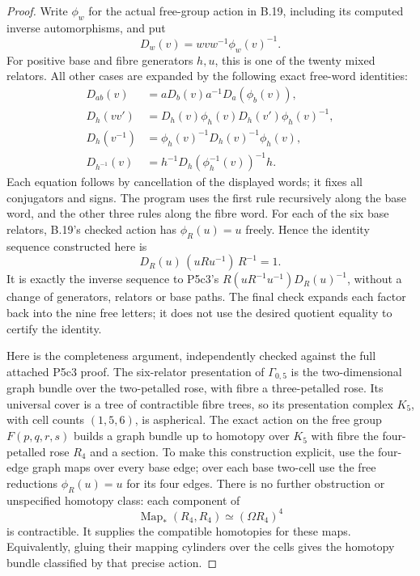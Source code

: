 \begin{proof}
Write $\phi_w$ for the actual free-group action in B.19,
including its computed inverse automorphisms, and put
\[
                   D_w(v)=wvw^{-1}\phi_w(v)^{-1}.
\]
For positive base and fibre generators $h,u$, this is
one of the twenty mixed relators.  All other cases
are expanded by the following exact free-word identities:
\[
\begin{split}
D_{ab}(v)&=aD_b(v)a^{-1}D_a(\phi_b(v)),\\
D_h(vv')&=D_h(v)\phi_h(v)D_h(v')\phi_h(v)^{-1},\\
D_h(v^{-1})&=\phi_h(v)^{-1}D_h(v)^{-1}\phi_h(v),\\
D_{h^{-1}}(v)&=h^{-1}D_h(\phi_h^{-1}(v))^{-1}h.
\end{split}                                                   \tag{D.9}
\]
Each equation follows by cancellation of the displayed
words; it fixes all conjugators and signs.  The program
uses the first rule recursively along the base word,
and the other three rules along the fibre word.
For each of the six base relators, B.19's checked action
has $\phi_R(u)=u$ freely.  Hence the identity sequence
constructed here is
\[
              D_R(u)\,(uRu^{-1})\,R^{-1}=1.                  \tag{D.10}
\]
It is exactly the inverse sequence to P5c3's
$R(uR^{-1}u^{-1})D_R(u)^{-1}$, without a change of
generators, relators or base paths.  The final check
expands each factor back into the nine free letters;
it does not use the desired quotient equality to
certify the identity.

Here is the completeness argument, independently
checked against the full attached P5c3 proof.  The
six-relator presentation of $\Gamma_{0,5}$ is the
two-dimensional graph bundle over the two-petalled
rose, with fibre a three-petalled rose.  Its universal
cover is a tree of contractible fibre trees, so its
presentation complex $K_5$, with cell counts $(1,5,6)$,
is aspherical.  The exact action on the free group
$F(p,q,r,s)$ builds a graph bundle up to homotopy over
$K_5$ with fibre the four-petalled rose $R_4$ and a
section.  To make this construction explicit, use
the four-edge graph maps over every base edge; over
each base two-cell use the free reductions
$\phi_R(u)=u$ for its four edges.  There is no further
obstruction or unspecified homotopy class: each
component of
\[
                 \operatorname{Map}_*(R_4,R_4)
                         \simeq(\Omega R_4)^4
\]
is contractible.  It supplies the compatible homotopies
for these maps.  Equivalently, gluing their mapping
cylinders over the cells gives the homotopy bundle
classified by that precise action.


\end{proof}
